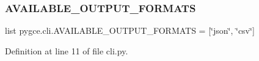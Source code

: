 \subsubsection{\texorpdfstring{A\+V\+A\+I\+L\+A\+B\+L\+E\+\_\+\+O\+U\+T\+P\+U\+T\+\_\+\+F\+O\+R\+M\+A\+TS}{AVAILABLE\_OUTPUT\_FORMATS}}
{\footnotesize\ttfamily list pygce.\+cli.\+A\+V\+A\+I\+L\+A\+B\+L\+E\+\_\+\+O\+U\+T\+P\+U\+T\+\_\+\+F\+O\+R\+M\+A\+TS = \mbox{[}\char`\"{}json\char`\"{}, \char`\"{}csv\char`\"{}\mbox{]}}



Definition at line 11 of file cli.\+py.

